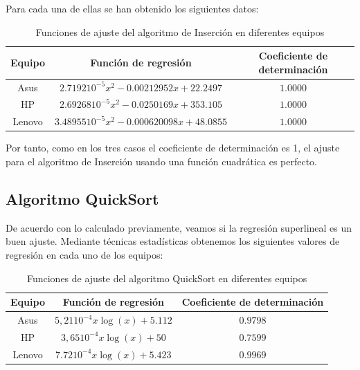 \documentclass{homework}
\begin{document}
    Para cada una de ellas se han obtenido los siguientes datos:

    \begin{table}[H]
        \centering
        \begin{tabular}{|c|c|c|}
            \hline
            Equipo & Función de regresión & Coeficiente de determinación \\
            \hline
            Asus & $2.7192 10^{-5} x^2 - 0.00212952 x + 22.2497$ & $1.0000$ \\
            HP & $2.69268 10^{-5} x^2 - 0.0250169 x + 353.105$ &  $1.0000$ \\
            Lenovo & $3.48955 10^{-5} x^{2} - 0.000620098 x + 48.0855$ & $1.0000$ \\
            \hline
        \end{tabular}
        \caption{Funciones de ajuste del algoritmo de Inserción en diferentes equipos}
    \end{table}

    Por tanto, como en los tres casos el coeficiente de determinación es 1, el ajuste para el algoritmo de Inserción 
    usando una función cuadrática es perfecto.

    \subsection{Algoritmo QuickSort}

    De acuerdo con lo calculado previamente, veamos si la regresión superlineal es un buen ajuste. Mediante técnicas estadísticas
    obtenemos los siguientes valores de regresión en cada uno de los equipos:

    \begin{table}[H]
        \centering
        \begin{tabular}{|c|c|c|}
            \hline
            Equipo & Función de regresión & Coeficiente de determinación \\
            \hline
            Asus & $5,21 10^{-4} x \log(x) + 5.112$ & $0.9798$ \\
            HP & $3,65 10^{-4} x \log(x) + 50$ & $0.7599$ \\
            Lenovo & $7.72 10^{-4} x \log(x) + 5.423$ & $0.9969$ \\
            \hline
        \end{tabular}
        \caption{Funciones de ajuste del algoritmo QuickSort en diferentes equipos}
    \end{table}
    
\end{document}
